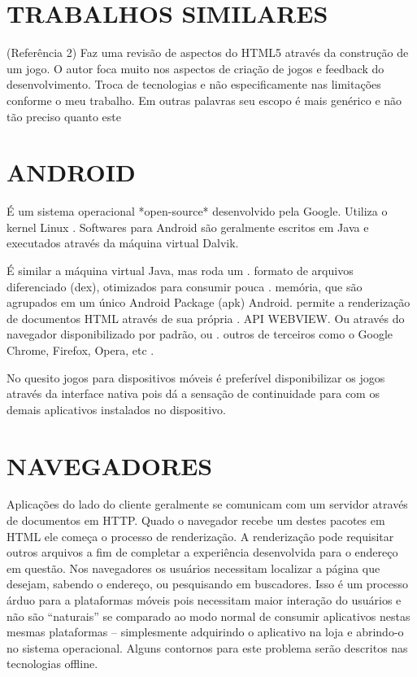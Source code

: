 \documentclass[11pt,a4paper]{article}
\begin{document}
\section{ TRABALHOS SIMILARES}

(Referência 2) Faz uma revisão de aspectos do HTML5 através da construção de um jogo. O autor foca muito nos aspectos de criação de jogos e feedback do desenvolvimento. Troca de tecnologias e não especificamente nas limitações conforme o meu trabalho. Em outras palavras seu escopo é mais genérico e não tão preciso quanto este

\section{ANDROID}

É um sistema operacional *open-source* desenvolvido pela Google. Utiliza o kernel Linux .
Softwares para Android são geralmente escritos em Java e executados através da máquina virtual Dalvik.

É similar a máquina virtual Java, mas roda um  .
formato de arquivos diferenciado (dex), otimizados para consumir pouca .
memória, que são agrupados em um único Android Package (apk) Android.
permite a renderização de documentos HTML através de sua própria   .
API WEBVIEW. Ou através do navegador disponibilizado por padrão, ou  .
outros de terceiros como o Google Chrome, Firefox, Opera, etc          .

No quesito jogos para dispositivos móveis é preferível disponibilizar
os jogos através da interface nativa pois dá a sensação de
continuidade para com os demais aplicativos instalados no dispositivo.



\section{NAVEGADORES}

Aplicações do lado do cliente geralmente se comunicam com um servidor através de documentos em HTTP. Quado o navegador recebe um destes pacotes em HTML ele começa o processo de renderização. A renderização pode requisitar outros arquivos a fim de completar a experiência desenvolvida para o endereço em questão.
Nos navegadores os usuários necessitam localizar a página que desejam, sabendo o endereço, ou pesquisando em buscadores. Isso é um processo árduo para a plataformas móveis pois necessitam maior interação do usuários e não são “naturais” se comparado ao modo normal de consumir aplicativos nestas mesmas plataformas – simplesmente adquirindo o aplicativo na loja e abrindo-o no sistema operacional. Alguns contornos para este problema serão descritos nas tecnologias offline.
\end{document}
